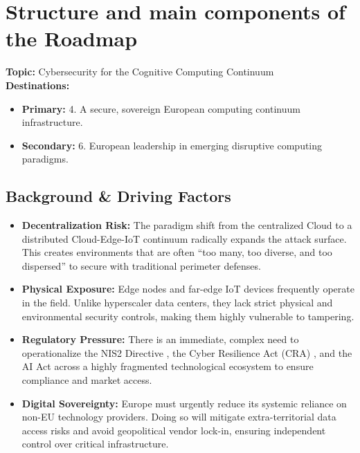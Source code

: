 \documentclass[12pt,a4paper]{report}
\begin{document}
\chapter{Structure and main components of the Roadmap}
\noindent\textbf{Topic:} Cybersecurity for the Cognitive Computing Continuum\\
\textbf{Destinations:}
\begin{itemize}
    \item \textbf{Primary:} 4. A secure, sovereign European computing continuum infrastructure.
    \item \textbf{Secondary:} 6. European leadership in emerging disruptive computing paradigms.
\end{itemize}

\section{Background \& Driving Factors}
\begin{itemize}
    \item \textbf{Decentralization Risk:} The paradigm shift from the centralized Cloud to a distributed Cloud-Edge-IoT continuum radically expands the attack surface. This creates environments that are often ``too many, too diverse, and too dispersed''  to secure with traditional perimeter defenses.
    \item \textbf{Physical Exposure:} Edge nodes and far-edge IoT devices frequently operate in the field. Unlike hyperscaler data centers, they lack strict physical and environmental security controls, making them highly vulnerable to tampering.
    \item \textbf{Regulatory Pressure:} There is an immediate, complex need to operationalize the NIS2 Directive \cite{nis2}, the Cyber Resilience Act (CRA) \cite{cra}, and the AI Act \cite{aiact} across a highly fragmented technological ecosystem to ensure compliance and market access.
    \item \textbf{Digital Sovereignty:} Europe must urgently reduce its systemic reliance on non-EU technology providers. Doing so will mitigate extra-territorial data access risks and avoid geopolitical vendor lock-in, ensuring independent control over critical infrastructure.
\end{itemize}
\end{document}
